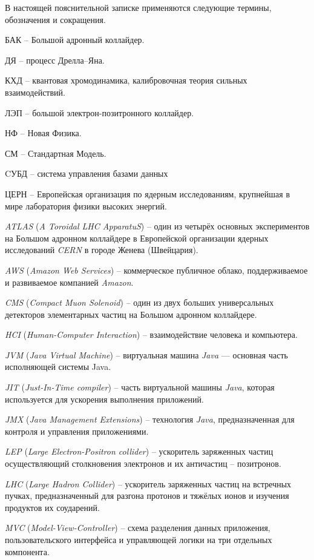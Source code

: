 В настоящей пояснительной записке применяются следующие термины, обозначения и сокращения.

БАК -- Большой адронный коллайдер.

ДЯ -- процесс Дрелла--Яна.

КХД -- квантовая хромодинамика, калибровочная теория сильных взаимодействий.

ЛЭП -- большой электрон-позитронного коллайдер.

НФ -- Новая Физика.

СМ -- Стандартная Модель.

CУБД -- система управления базами данных

ЦЕРН -- Европейская организация по ядерным исследованиям, крупнейшая в мире лаборатория физики высоких энергий.

\textit{ATLAS} (\textit{A Toroidal LHC ApparatuS}) -- один из четырёх основных экспериментов на Большом адронном коллайдере в Европейской организации ядерных исследований \textit{CERN} в городе Женева (Швейцария).

\textit{AWS} (\textit{Amazon Web Services}) -- коммерческое публичное облако, поддерживаемое и развиваемое компанией \textit{Amazon}.

\textit{CMS} (\textit{Compact Muon Solenoid}) -- один из двух больших универсальных детекторов элементарных частиц на Большом адронном коллайдере.

\textit{HCI} (\textit{Human-Computer Interaction}) -- взаимодействие человека и компьютера.

\textit{JVM} (\textit{Java Virtual Machine}) -- виртуальная машина \textit{Java} — основная часть исполняющей системы Java.

\textit{JIT} (\textit{Just-In-Time compiler}) -- часть виртуальной машины \textit{Java}, которая используется для ускорения выполнения приложений.

\textit{JMX} (\textit{Java Management Extensions}) -- технология \textit{Java}, предназначенная для контроля и управления приложениями.

\textit{LEP} (\textit{Large Electron-Positron collider}) -- ускоритель заряженных частиц осуществляющий столкновения электронов и их античастиц -- позитронов.

\textit{LHC} (\textit{Large Hadron Collider}) --  ускоритель заряженных частиц на встречных пучках, предназначенный для разгона протонов и тяжёлых ионов и изучения продуктов их соударений.

\textit{MVC} (\textit{Model-View-Controller}) -- схема разделения данных приложения, пользовательского интерфейса и управляющей логики на три отдельных компонента.

